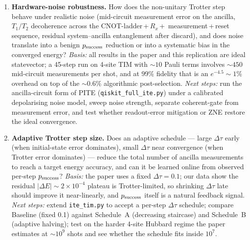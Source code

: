 \begin{enumerate}
  \item \textbf{Hardware-noise robustness.} How does the non-unitary Trotter
        step behave under realistic noise (mid-circuit measurement error on
        the ancilla, $T_1/T_2$ decoherence across the CNOT-ladder\,+\,$R_x$\,+\,
        measurement\,+\,reset sequence, residual system--ancilla entanglement
        after discard), and does noise translate into a benign $p_{\rm success}$
        reduction or into a systematic bias in the converged energy?
        \emph{Basis:} all results in the paper and this replication are ideal
        statevector; a 45-step run on 4-site TIM with $\sim 10$ Pauli terms
        involves $\sim 450$ mid-circuit measurements per shot, and at 99\%
        fidelity that is an $e^{-4.5}\!\sim\!1\%$ overhead on top of the
        $\sim 0.6\%$ algorithmic post-selection.
        \emph{Next steps:} run the ancilla-circuit form of PITE
        (\texttt{qiskit\_full\_ite.py}) under a calibrated depolarising
        noise model, sweep noise strength, separate coherent-gate from
        measurement error, and test whether readout-error mitigation or ZNE
        restore the ideal convergence.

  \item \textbf{Adaptive Trotter step size.} Does an adaptive schedule --- large
        $\Delta\tau$ early (when initial-state error dominates), small
        $\Delta\tau$ near convergence (when Trotter error dominates) --- reduce
        the total number of ancilla measurements to reach a target energy
        accuracy, and can it be learned online from observed per-step
        $p_{\rm success}$?
        \emph{Basis:} the paper uses a fixed $\Delta\tau = 0.1$; our data
        show the residual $|\Delta E|\sim 2\times 10^{-4}$ plateau is
        Trotter-limited, so shrinking $\Delta\tau$ late should improve it
        near-linearly, and $p_{\rm success}$ itself is a natural feedback
        signal.
        \emph{Next steps:} extend \texttt{ite\_tim.py} to accept a per-step
        $\Delta\tau$ schedule; compare Baseline (fixed 0.1) against Schedule~A
        (decreasing staircase) and Schedule~B (adaptive halving); test on the
        harder 4-site Hubbard regime the paper estimates at $\sim 10^9$
        shots and see whether the schedule fits inside $10^7$.
\end{enumerate}
